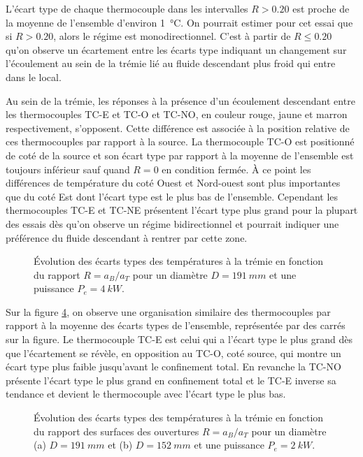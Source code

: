 L'écart type de chaque thermocouple dans les intervalles ${R>0.20}$ est proche de la moyenne de l'ensemble d'environ \SI{1}{\celsius}. On pourrait estimer pour cet essai que si ${R>0.20}$, alors le régime est monodirectionnel. C'est à partir de ${R\leq 0.20}$ qu'on observe un écartement entre les écarts type indiquant un changement sur l'écoulement au sein de la trémie lié au fluide descendant plus froid qui entre dans le local.

Au sein de la trémie, les réponses à la présence d'un écoulement descendant entre les thermocouples TC-E et TC-O et TC-NO, en couleur rouge, jaune et marron respectivement, s'opposent. Cette différence est associée à la position relative de ces thermocouples par rapport à la source. La thermocouple TC-O est positionné de coté de la source et son écart type par rapport à la moyenne de l'ensemble est toujours inférieur sauf quand $R=0$ en condition fermée. À ce point les différences de température du coté Ouest et Nord-ouest sont plus importantes que du coté Est dont l'écart type est le plus bas de l'ensemble. Cependant les thermocouples TC-E et TC-NE présentent l'écart type plus grand pour la plupart des essais dès qu'on observe un régime bidirectionnel et pourrait indiquer une préférence du fluide descendant à rentrer par cette zone.

\begin{figure}
\centering
\resizebox{0.7\textwidth}{!}{}
\caption{Évolution des écarts types des températures à la trémie en fonction du rapport $R=a_B/a_T$ pour un diamètre $D=\SI{191}{mm}$ et une puissance $P_e=\SI{4}{kW}$.}
\label{fig:sigma_tc_D191_2R}
\end{figure}

Sur la figure \ref{fig:sigma_tc_D191_D152_1R}, on observe une organisation similaire des thermocouples par rapport à la moyenne des écarts types de l'ensemble, représentée par des carrés sur la figure. Le thermocouple TC-E est celui qui a l'écart type le plus grand dès que l'écartement se révèle, en opposition au TC-O, coté source, qui montre un écart type plus faible jusqu'avant le confinement total. En revanche la TC-NO présente l'écart type le plus grand en confinement total et le TC-E inverse sa tendance et devient le thermocouple avec l'écart type le plus bas.

\begin{figure}
\centering
\begin{subfigure}[t]{0.495\textwidth}
\resizebox{\textwidth}{!}{}
\caption{}
\label{fig:sigma_tc_D191_1R}
\end{subfigure}
\begin{subfigure}[t]{0.495\textwidth}
\centering
\resizebox{\textwidth}{!}{}
\caption{}
\label{fig:sigma_tc_D152_1R}
\end{subfigure}
\caption{Évolution des écarts types des températures à la trémie en fonction du rapport des surfaces des ouvertures $R=a_B/a_T$ pour un diamètre (a) $D=\SI{191}{mm}$ et (b) $D=\SI{152}{mm}$ et une puissance $P_e=\SI{2}{kW}$.}
\label{fig:sigma_tc_D191_D152_1R}
\end{figure}

